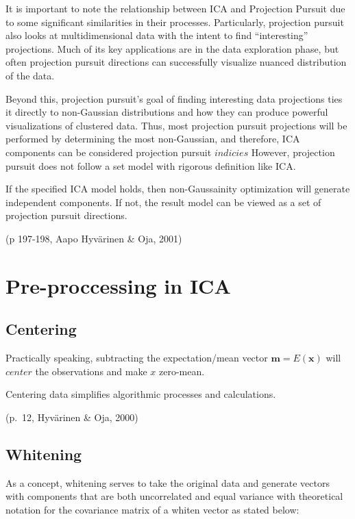 \documentclass[12pt,twoside]{amherstthesis}
\begin{document}
  It is important to note the relationship between ICA and Projection
  Pursuit due to some significant similarities in their processes.
  Particularly, projection pursuit also looks at multidimensional data
  with the intent to find ``interesting'' projections. Much of its key
  applications are in the data exploration phase, but often projection
  pursuit directions can successfully visualize nuanced distribution of
  the data.
  
  Beyond this, projection pursuit's goal of finding interesting data
  projections ties it directly to non-Gaussian distributions and how they
  can produce powerful visualizations of clustered data. Thus, most
  projection pursuit projections will be performed by determining the most
  non-Gaussian, and therefore, ICA components can be considered projection
  pursuit \(\textit{indicies}\) However, projection pursuit does not
  follow a set model with rigorous definition like ICA.
  
  If the specified ICA model holds, then non-Gaussainity optimization will
  generate independent components. If not, the result model can be viewed
  as a set of projection pursuit directions.
  
  (p 197-198, Aapo Hyvärinen \& Oja, 2001)
  
  \section{Pre-proccessing in ICA}\label{pre-proccessing-in-ica}
  
  \subsection{Centering}\label{centering}
  
  Practically speaking, subtracting the expectation/mean vector
  \(\textbf{m} = E({\textbf{x}})\) will \(\textit{center}\) the
  observations and make \(x\) zero-mean.
  
  Centering data simplifies algorithmic processes and calculations.
  
  (p.~12, Hyvärinen \& Oja, 2000)
  
  \subsection{Whitening}\label{whitening}
  
  As a concept, whitening serves to take the original data and generate
  vectors with components that are both uncorrelated and equal variance
  with theoretical notation for the covariance matrix of a whiten vector
  as stated below:
  
\end{document}
